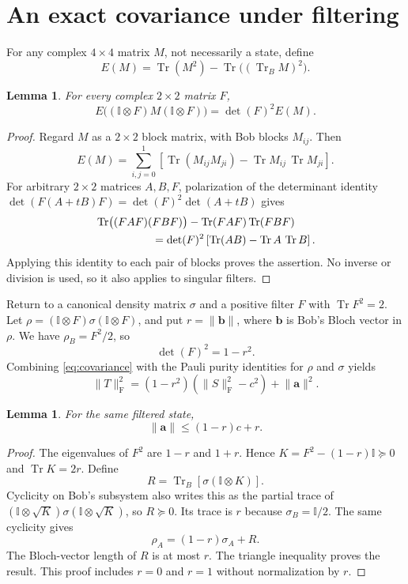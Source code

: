 \documentclass[11pt]{article}
\newtheorem{lemma}[theorem]{Lemma}
\newcommand{\tr}{\operatorname{Tr}}
\newcommand{\Id}{\mathbb{I}}
\newcommand{\norm}[1]{\lVert #1\rVert}
\begin{document}
\section{An exact covariance under filtering}
For any complex $4\times4$ matrix $M$, not necessarily a state, define
\[
 E(M)=\tr(M^2)-\tr\bigl((\tr_B M)^2\bigr).
\]
\begin{lemma}\label{lem:covariance}
For every complex $2\times2$ matrix $F$,
\begin{equation}\label{eq:covariance}
 E\bigl((\Id\otimes F)M(\Id\otimes F)\bigr)
  =\det(F)^2 E(M).
\end{equation}
\end{lemma}
\begin{proof}
Regard $M$ as a $2\times2$ block matrix, with Bob blocks $M_{ij}$. Then
\[
 E(M)=\sum_{i,j=0}^{1}\left[
 \tr(M_{ij}M_{ji})-\tr M_{ij}\,\tr M_{ji}\right].
\]
For arbitrary $2\times2$ matrices $A,B,F$, polarization of the determinant identity
$\det(F(A+tB)F)=\det(F)^2\det(A+tB)$ gives
\begin{align*}
 &\tr\bigl((FAF)(FBF)\bigr)-\tr(FAF)\tr(FBF)\\
 &\hspace{18mm}=\det(F)^2\left[\tr(AB)-\tr A\,\tr B\right].
\end{align*}
Applying this identity to each pair of blocks proves the assertion. No inverse or division is used, so it also applies to singular filters.
\end{proof}

Return to a canonical density matrix $\sigma$ and a positive filter $F$ with $\tr F^2=2$. Let
$\rho=(\Id\otimes F)\sigma(\Id\otimes F)$, and put $r=\norm{\mathbf b}$, where $\mathbf b$ is Bob's Bloch vector in $\rho$. We have $\rho_B=F^2/2$, so
\begin{equation}\label{eq:detfilter}
 \det(F)^2=1-r^2.
\end{equation}
Combining \eqref{eq:covariance} with the Pauli purity identities for $\rho$ and $\sigma$ yields
\begin{equation}\label{eq:correlationfilter}
 \norm T_{\mathrm F}^2
  =(1-r^2)(\norm S_{\mathrm F}^2-c^2)+\norm{\mathbf a}^{2}.
\end{equation}

\begin{lemma}\label{lem:local}
For the same filtered state,
\[
 \norm{\mathbf a}\leq (1-r)c+r.
\]
\end{lemma}
\begin{proof}
The eigenvalues of $F^2$ are $1-r$ and $1+r$. Hence
$K=F^2-(1-r)\Id\succeq0$ and $\tr K=2r$. Define
\[
 R=\tr_B\left[\sigma(\Id\otimes K)\right].
\]
Cyclicity on Bob's subsystem also writes this as the partial trace of
$(\Id\otimes\sqrt K)\sigma(\Id\otimes\sqrt K)$, so $R\succeq0$. Its trace is $r$ because $\sigma_B=\Id/2$. The same cyclicity gives
\[
 \rho_A=(1-r)\sigma_A+R.
\]
The Bloch-vector length of $R$ is at most $r$. The triangle inequality proves the result. This proof includes $r=0$ and $r=1$ without normalization by $r$.
\end{proof}
\end{document}

